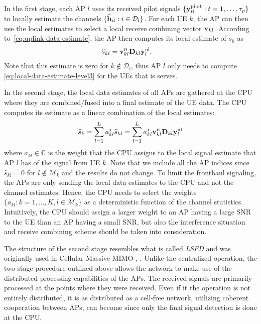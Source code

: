 In the first stage, each AP $l$ uses its received pilot signals $\{ \mathbf{y}_{t l}^{\rm pilot} : t = 1,\ldots,\tau_p \}$ to locally estimate the channels $\{\widehat{{\bf h}}_{il} : i \in {\mathcal D}_l \}$.
For each UE $k$, the AP can then use the local estimates to select a local receive combining vector ${\bf v}_{kl}$. According to~\eqref{eq:uplink-data-estimate}, the AP then computes its local estimate of $s_k$ as 
\begin{align} \label{eq:local-data-estimate-level3}
\widehat s_{kl} &= \vect{v}_{kl}^{\Htran} \vect{D}_{kl} {\bf y}_{l}^{\rm{ul}}.
\end{align}
Note that this estimate is zero for $k \not \in \mathcal{D}_l$, thus AP $l$ only needs to compute \eqref{eq:local-data-estimate-level3} for the UEs that is serves.

In the second stage, the local data estimates of all APs are gathered at the CPU where they are combined/fused into a final estimate of the UE data. The CPU computes its estimate as a linear combination of the local estimates:
\begin{align} \label{eq:global-data-estimate-level3}
\widehat{s}_k = \sum_{l=1}^{L} a_{kl}^{\star} \widehat{s}_{kl} = \sum_{l=1}^{L} a_{kl}^{\star} \vect{v}_{kl}^{\Htran} \vect{D}_{kl} {\bf y}_{l}^{\rm{ul}}
\end{align}
where $a_{kl} \in \mathbb{C}$ is the weight that the CPU assigns to the local signal estimate that AP $l$ has of the signal from UE $k$. Note that we include all the AP indices since $\widehat s_{kl}=0$ for $l\notin \mathcal{M}_k$ and the results do not change.
To limit the fronthaul signaling, the APs are only sending the local data estimates to the CPU and not the channel estimates. Hence, the CPU needs to select the weights  $\{ a_{kl} : k=1,\ldots,K, l \in \mathcal{M}_k\}$ as a deterministic function of the channel statistics. Intuitively, the CPU should assign a larger weight to an AP having a large \gls{SNR} to the UE than an AP having a small \gls{SNR}, but also the interference situation and receive combining scheme should be taken into consideration. 

The structure of the second stage resembles what is called \emph{\gls{LSFD}} and was originally used in Cellular Massive MIMO \cite{Adhikary2017a}, \cite{ashikhmin2012pilot}. Unlike the centralized operation, the two-stage procedure outlined above allows the network to make use of the distributed processing capabilities of the APs. The received signals are primarily processed at the points where they were received. Even if it the operation is not entirely distributed, it is as distributed as a cell-free network, utilizing coherent cooperation between APs, can become since only the final signal detection is done at the CPU.

